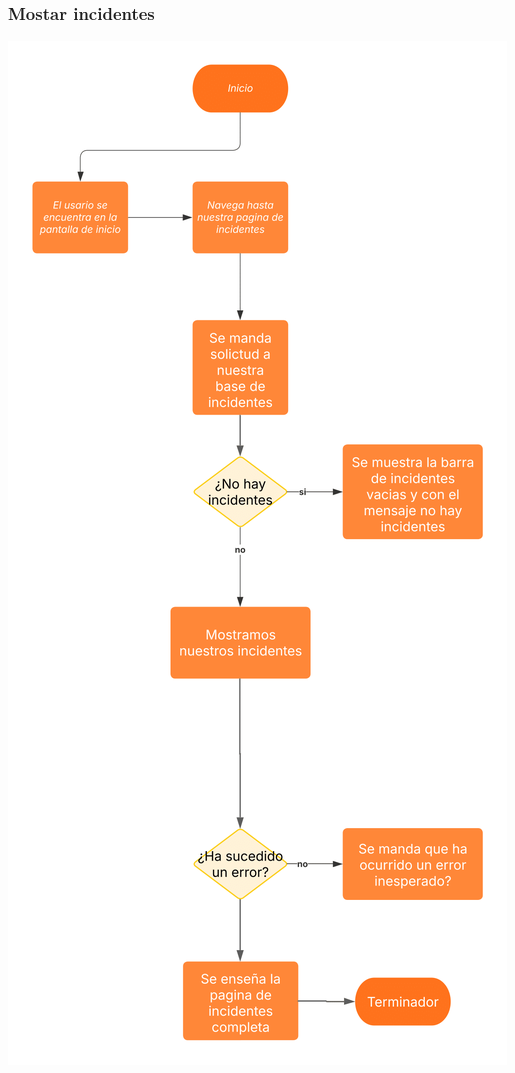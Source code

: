 \subsubsection*{Mostar incidentes}
\begin{center}
    \includegraphics[scale = .9]{Ite02/MostrarIncidentes-1.png}
\end{center}

